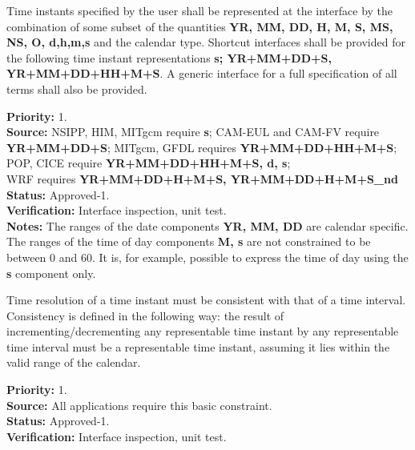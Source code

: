 Time instants specified by the user shall be represented at the interface by the 
combination of some subset of the quantities {\bf YR, MM, DD, H, M, S, MS, NS, O,
d,h,m,s} 
and the calendar type.  Shortcut interfaces shall be provided for the following time 
instant representations {\bf s; YR+MM+DD+S, YR+MM+DD+HH+M+S}. A generic interface for a 
full specification of all terms shall also be provided.
\begin{reqlist}
{\bf Priority:} 1. \\
{\bf Source:} NSIPP, HIM, MITgcm require {\bf s}; 
CAM-EUL and CAM-FV require {\bf YR+MM+DD+S};
MITgcm, GFDL requires {\bf YR+MM+DD+HH+M+S}; 
POP, CICE require {\bf YR+MM+DD+HH+M+S, d, s}; \\
WRF requires {\bf YR+MM+DD+H+M+S, YR+MM+DD+H+M+S\_nd} \\
{\bf Status:} Approved-1. \\
{\bf Verification:} Interface inspection, unit test. \\
{\bf Notes:} The ranges of the date components {\bf YR, MM, DD} are
calendar specific.  The ranges of the time of day components {\bf M, s} are
not constrained to be between 0 and 60.  It is, for example, possible to
express the time of day using the {\bf s} component only.  
\end{reqlist}

Time resolution of a time instant must be consistent with that of a time interval.
Consistency is defined in the following way:  the result of incrementing/decrementing 
any representable time instant by any representable time interval must be a representable 
time instant, assuming it lies within the valid range of the calendar.
\begin{reqlist}
{\bf Priority:} 1. \\
{\bf Source:} All applications require this basic constraint.\\
{\bf Status:} Approved-1. \\
{\bf Verification:} Interface inspection, unit test. 
\end{reqlist}

\label{req:calendar}

